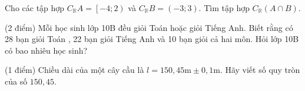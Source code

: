 \begin{bt}%
	Cho các tập hợp $C_{\mathbb{R}} A =\left[ -4;2 \right)$ và $C_{\mathbb{R}}B =\left(-3;3 \right)$. Tìm tập hợp $C_{\mathbb{R}}\left( A\cap B \right)$.
	\loigiai{Tập hợp $C_{\mathbb{R}} A =\left[ -4;2 \right) \Rightarrow A=\left( -\infty;-4 \right)\cup \left[ {2; +\infty}\right)$.\\
		Tập hợp $C_{\mathbb{R}}B =\left(-3;3 \right)\Rightarrow B=\left( -\infty;-3 \right]\cup \left[ {3; +\infty}\right)$.\\
		Tập hợp $A \cap B= \left( -\infty;-4 \right)\cup \left[ {3; +\infty}\right) \Rightarrow C_{\mathbb{R}}\left( {A \cap B}\right)= \left[ {-4; 3}\right)$.}
\end{bt}


\begin{bt}%
	(2 điểm) 		
	Mỗi học sinh lớp 10B đều giỏi Toán hoặc giỏi Tiếng Anh. Biết rằng có 28 bạn giỏi Toán , 22 bạn giỏi Tiếng Anh và 10 bạn giỏi cả hai môn. Hỏi lớp 10B có bao nhiêu học sinh?
\end{bt}

\begin{bt}%
	(1 điểm) 		Chiều dài của một cây cầu  là $l=150,45 \mathrm{m}\pm 0,1 \mathrm{m}$. Hãy viết số quy tròn của số $150,45$.
\end{bt}


